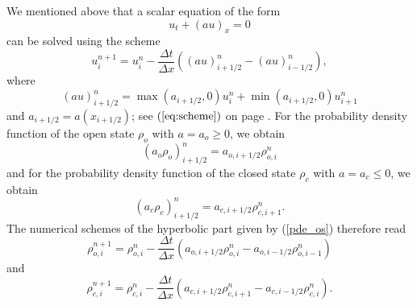 \bigskip 
We mentioned above that a scalar equation of the form
\begin{equation}
u_{t}+\left(  au\right)  _{x}=0
\end{equation}
can be solved using the scheme %
\begin{equation}
u_{i}^{n+1}=u_{i}^{n}-\frac{\Delta t}{\Delta x}\left(  \left(  au\right)
_{i+1/2}^{n}-\left(  au\right)  _{i-1/2}^{n}\right)  ,\label{eq:scheme_os}%
\end{equation}
where%
\begin{equation}
\left(  au\right)  _{i+1/2}^{n}=\max(a_{i+1/2},0)u_{i}^{n}+\min(a_{i+1/2}%
,0)u_{i+1}^{n} \label{eq:flux_os}%
\end{equation}
and $a_{i+1/2}=a(x_{i+1/2})$;
see $\left(  \ref{eq:scheme}\right)  $ on page \pageref{npdf}. For the probability
density function of the open state $\rho_{o}$ with $a=a_{o}\geq0$, we obtain
\begin{equation}
\left(  a_{o}\rho_{o}\right)  _{i+1/2}^{n}=a_{o,i+1/2}\rho_{o,i}^{n}%
\end{equation}
and for the probability density function of the closed state $\rho_{c}$ with
$a=a_{c}\leq0$, we obtain
\begin{equation}
\left(  a_{c}\rho_{c}\right)  _{i+1/2}^{n}=a_{c,i+1/2}\rho_{c,i+1}^{n}.
\end{equation}
The numerical schemes of the hyperbolic part given by (\ref{pde_os}) therefore read%
\begin{equation}
\rho_{o,i}^{n+1}=\rho_{o,i}^{n}-\frac{\Delta t}{\Delta x}\left(
a_{o,i+1/2}\rho_{o,i}^{n}-a_{o,i-1/2}\rho_{o,i-1}^{n}\right)  
\end{equation}
and
\begin{equation}
\rho_{c,i}^{n+1}=\rho_{c,i}^{n}-\frac{\Delta t}{\Delta x}\left(
a_{c,i+1/2}\rho_{c,i+1}^{n}-a_{c,i-1/2}\rho_{c,i}^{n}\right)  .
\end{equation}

